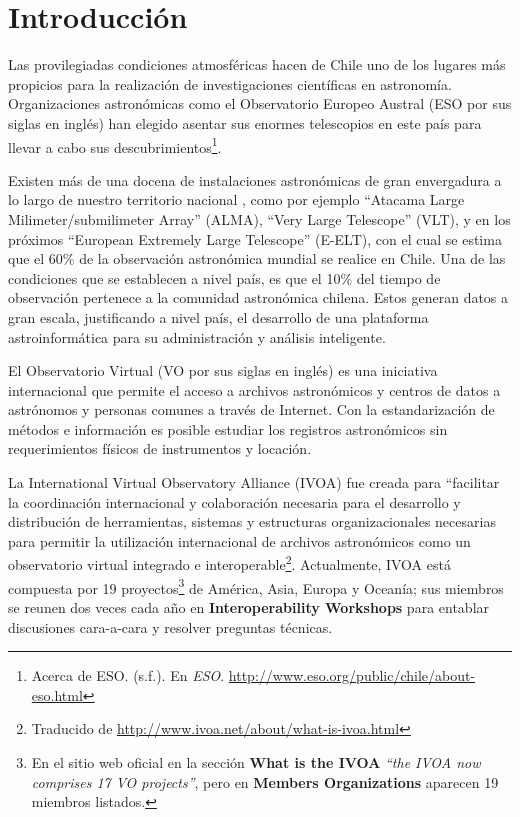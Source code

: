 \section{Introducción}

Las provilegiadas condiciones atmosféricas hacen de Chile uno de los lugares
más propicios para la realización de investigaciones científicas en astronomía.
Organizaciones astronómicas como el Observatorio Europeo Austral (ESO por sus
siglas en inglés) han elegido asentar sus enormes telescopios en este país para 
llevar a cabo sus descubrimientos\footnote{Acerca de ESO. (s.f.). En
\textit{ESO}. \url{http://www.eso.org/public/chile/about-eso.html}}. 

Existen más de una docena de instalaciones astronómicas de gran envergadura a
lo largo de nuestro territorio nacional \cite{observatorios_chile}, como por
ejemplo ``Atacama Large Milimeter/submilimeter Array'' (ALMA), ``Very Large
Telescope'' (VLT), y en los próximos ``European Extremely Large Telescope''
(E-ELT), con el cual se estima que el 60\% de la observación astronómica
mundial se realice en Chile.  Una de las condiciones que se establecen a nivel
país, es que el 10\% del tiempo de observación pertenece a la comunidad
astronómica chilena. Estos generan datos a gran escala, justificando a nivel
país, el desarrollo de una plataforma astroinformática para su administración y
análisis inteligente.

El Observatorio Virtual (VO por sus siglas en inglés) es una iniciativa
internacional que permite el acceso a archivos astronómicos y centros de datos
a astrónomos y personas comunes a través de Internet. Con la estandarización de
métodos e información es posible estudiar los registros astronómicos sin
requerimientos físicos de instrumentos y locación.

La International Virtual Observatory Alliance (IVOA) fue creada para
``facilitar la coordinación internacional y colaboración necesaria para el
desarrollo y distribución de herramientas, sistemas y estructuras
organizacionales necesarias para permitir la utilización internacional de
archivos astronómicos como un observatorio virtual integrado e 
interoperable\footnote{Traducido de \url{http://www.ivoa.net/about/what-is-ivoa.html}}.
Actualmente, IVOA está compuesta por 19 proyectos\footnote{En el sitio web oficial en la
sección \textbf{What is the IVOA} \textit{``the IVOA now comprises 17 VO
projects''}, pero en \textbf{Members Organizations} aparecen 19 miembros
listados.} de América, Asia, Europa y Oceanía; sus miembros se reunen
dos veces cada año en \textbf{Interoperability Workshops} para entablar
discusiones cara-a-cara y resolver preguntas técnicas.

